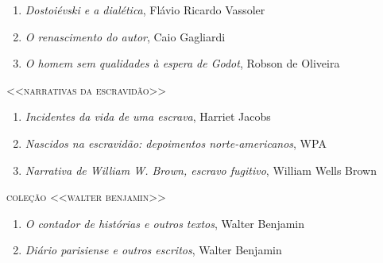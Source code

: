\begin{enumerate}
\setlength\parskip{4.2pt}
\setlength\itemsep{-1.4mm}
\item \textit{Dostoiévski e a dialética}, Flávio Ricardo Vassoler
\item \textit{O renascimento do autor}, Caio Gagliardi
\item \textit{O homem sem qualidades à espera de Godot}, Robson de Oliveira
\end{enumerate}

\medskip
{\large\textsc{<<narrativas da escravidão>>}}

\begin{enumerate}
\setlength\parskip{4.2pt}
\setlength\itemsep{-1.4mm}
\item \textit{Incidentes da vida de uma escrava}, Harriet Jacobs
\item \textit{Nascidos na escravidão: depoimentos norte-americanos}, WPA
\item \textit{Narrativa de William W. Brown, escravo fugitivo}, William Wells Brown
\end{enumerate}

\medskip
{\large\textsc{coleção <<walter benjamin>>}}

\begin{enumerate}
\setlength\parskip{4.2pt}
\setlength\itemsep{-1.4mm}
\item \textit{O contador de histórias e outros textos}, Walter Benjamin
\item \textit{Diário parisiense e outros escritos}, Walter Benjamin
\end{enumerate}

\endgroup

\pagebreak
\ifodd\thepage\paginabranca\else\clearpage\fi
